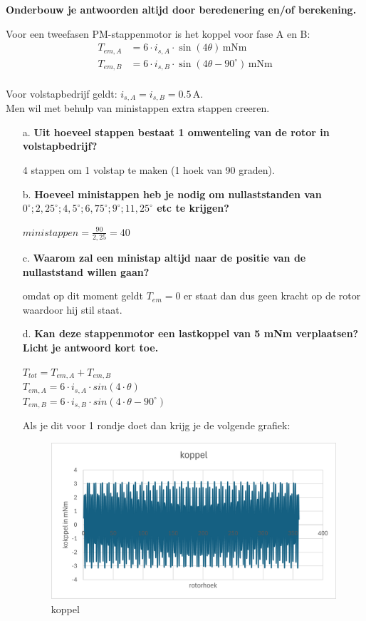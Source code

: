 \textbf{Onderbouw je antwoorden altijd door beredenering en/of berekening.}

Voor een tweefasen PM-stappenmotor is het koppel voor fase A en B:
\begin{align*}
    T_{em,A} &= 6 \cdot i_{s,A} \cdot \sin(4\theta) \, \text{mNm} \\
    T_{em,B} &= 6 \cdot i_{s,B} \cdot \sin(4\theta - 90^\circ) \, \text{mNm}
    \end{align*}\\
Voor volstapbedrijf geldt: \(i_{s,A} = i_{s,B} = 0.5 \, \text{A}\).\\
Men wil met behulp van ministappen extra stappen creeren.    


\begin{enumerate}
    \item [a.] \textbf{Uit hoeveel stappen bestaat 1 omwenteling van de rotor in volstapbedrijf?}
    
        4 stappen om 1 volstap te maken (1 hoek van 90 graden).

    \item [b.] \textbf{Hoeveel ministappen heb je nodig om nullaststanden van $0^\circ ; 2,25^\circ ; 4,5^\circ ; 6,75^\circ ; 9^\circ ; 11,25^\circ$ etc te krijgen?}
    
        $ministappen = \frac{90}{2,25} = 40$

    \item [c.] \textbf{Waarom zal een ministap altijd naar de positie van de nullaststand willen gaan?}
    
        omdat op dit moment geldt $T_{em} = 0$ er staat dan dus geen kracht op de rotor  waardoor hij stil staat.


    \item [d.] \textbf{Kan deze stappenmotor een lastkoppel van 5 mNm verplaatsen?
    Licht je antwoord kort toe.}     
    
        $T_{tot} = T_{em,A} + T_{em,B}$\\
        $T_{em,A} = 6 \cdot i_{s,A} \cdot sin(4 \cdot \theta)$\\
        $T_{em,B} = 6 \cdot i_{s,B} \cdot sin(4 \cdot \theta - 90^\circ)$

        Als je dit voor 1 rondje doet dan krijg je de volgende grafiek:
        \begin{figure}[h]
            \centering
            \includegraphics[scale=0.9]{4e.png}
            \caption{koppel}
            \label{fig:4e}
        \end{figure}


\end{enumerate}
